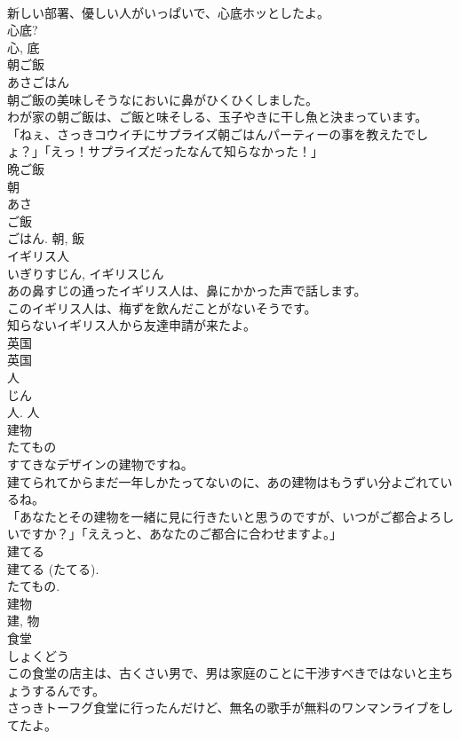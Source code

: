 \documentclass[8pt]{extreport}
\begin{document}
\begin{CJK}{UTF8}{min}
\\	新しい部署、優しい人がいっぱいで、心底ホッとしたよ。	
\\	心底? 
\\	心, 底	
\\	朝ご飯	
\\	あさごはん	
\\	朝ご飯の美味しそうなにおいに鼻がひくひくしました。	
\\	わが家の朝ご飯は、ご飯と味そしる、玉子やきに干し魚と決まっています。	
\\	「ねぇ、さっきコウイチにサプライズ朝ごはんパーティーの事を教えたでしょ？」「えっ！サプライズだったなんて知らなかった！」	
\\	晩ご飯 
\\	朝 
\\	あさ 
\\	ご飯 
\\	ごはん.	朝, 飯	
\\	イギリス人	
\\	いぎりすじん, イギリスじん	
\\	あの鼻すじの通ったイギリス人は、鼻にかかった声で話します。	
\\	このイギリス人は、梅ずを飲んだことがないそうです。	
\\	知らないイギリス人から友達申請が来たよ。	
\\	英国 
\\	英国 
\\	人 
\\	じん 
\\	人.	人	
\\	建物	
\\	たてもの	
\\	すてきなデザインの建物ですね。	
\\	建てられてからまだ一年しかたってないのに、あの建物はもうずい分よごれているね。	
\\	「あなたとその建物を一緒に見に行きたいと思うのですが、いつがご都合よろしいですか？」「ええっと、あなたのご都合に合わせますよ。」	
\\	建てる 
\\	建てる (たてる). 
\\	たてもの. 
\\	建物 
\\	建, 物	
\\	食堂	
\\	しょくどう	
\\	この食堂の店主は、古くさい男で、男は家庭のことに干渉すべきではないと主ちょうするんです。	
\\	さっきトーフグ食堂に行ったんだけど、無名の歌手が無料のワンマンライブをしてたよ。	

\end{CJK}
\end{document}
